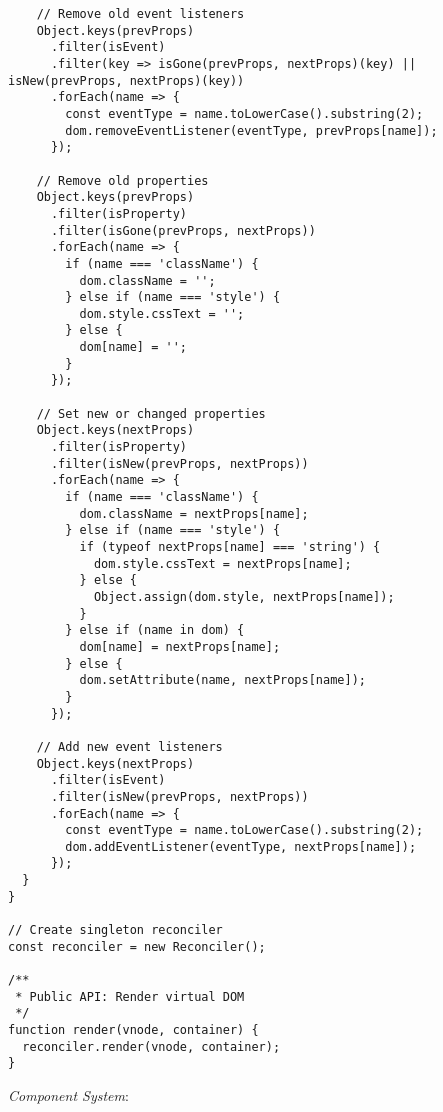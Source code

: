 \documentclass[11pt]{article}
\begin{document}
\begin{verbatim}
    // Remove old event listeners
    Object.keys(prevProps)
      .filter(isEvent)
      .filter(key => isGone(prevProps, nextProps)(key) || isNew(prevProps, nextProps)(key))
      .forEach(name => {
        const eventType = name.toLowerCase().substring(2);
        dom.removeEventListener(eventType, prevProps[name]);
      });
    
    // Remove old properties
    Object.keys(prevProps)
      .filter(isProperty)
      .filter(isGone(prevProps, nextProps))
      .forEach(name => {
        if (name === 'className') {
          dom.className = '';
        } else if (name === 'style') {
          dom.style.cssText = '';
        } else {
          dom[name] = '';
        }
      });
    
    // Set new or changed properties
    Object.keys(nextProps)
      .filter(isProperty)
      .filter(isNew(prevProps, nextProps))
      .forEach(name => {
        if (name === 'className') {
          dom.className = nextProps[name];
        } else if (name === 'style') {
          if (typeof nextProps[name] === 'string') {
            dom.style.cssText = nextProps[name];
          } else {
            Object.assign(dom.style, nextProps[name]);
          }
        } else if (name in dom) {
          dom[name] = nextProps[name];
        } else {
          dom.setAttribute(name, nextProps[name]);
        }
      });
    
    // Add new event listeners
    Object.keys(nextProps)
      .filter(isEvent)
      .filter(isNew(prevProps, nextProps))
      .forEach(name => {
        const eventType = name.toLowerCase().substring(2);
        dom.addEventListener(eventType, nextProps[name]);
      });
  }
}

// Create singleton reconciler
const reconciler = new Reconciler();

/**
 * Public API: Render virtual DOM
 */
function render(vnode, container) {
  reconciler.render(vnode, container);
}
\end{verbatim}

\emph{Component System}:
\end{document}
